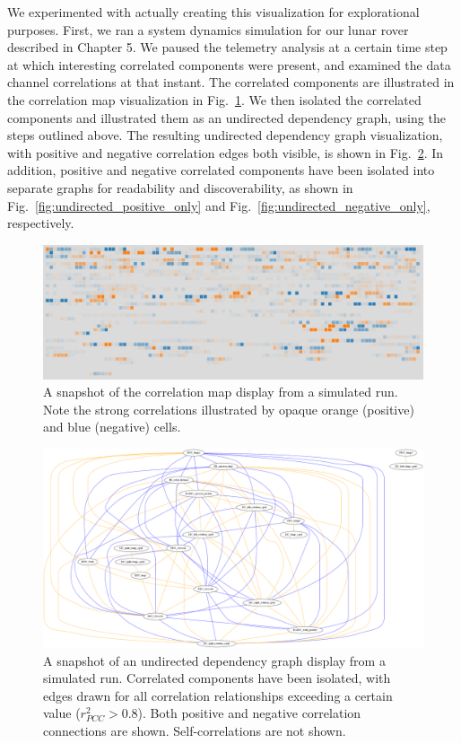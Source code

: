 We experimented with actually creating this visualization for explorational purposes. First, we ran a system dynamics simulation for our lunar rover described in Chapter 5. We paused the telemetry analysis at a certain time step at which interesting correlated components were present, and examined the data channel correlations at that instant. The correlated components are illustrated in the correlation map visualization in Fig.~\ref{fig:comparison_correlation_map}. We then isolated the correlated components and illustrated them as an undirected dependency graph, using the steps outlined above. The resulting undirected dependency graph visualization, with positive and negative correlation edges both visible, is shown in Fig.~\ref{fig:undirected_both}. In addition, positive and negative correlated components have been isolated into separate graphs for readability and discoverability, as shown in Fig.~\ref{fig:undirected_positive_only} and Fig.~\ref{fig:undirected_negative_only}, respectively.

\begin{figure}[h]
\centering
    \includegraphics[width=\columnwidth]{images/comparison_correlation_map.png}
    \caption{A snapshot of the correlation map display from a simulated run. Note the strong correlations illustrated by opaque orange (positive) and blue (negative) cells.}
    \label{fig:comparison_correlation_map}
\end{figure}

\begin{figure}[h]
\centering
    \includegraphics[width=\columnwidth]{images/undirected_both.png}
    \caption{A snapshot of an undirected dependency graph display from a simulated run. Correlated components have been isolated, with edges drawn for all correlation relationships exceeding a certain value ($r_{PCC}^{2} > 0.8$). Both positive and negative correlation connections are shown. Self-correlations are not shown.}
    \label{fig:undirected_both}
\end{figure}

